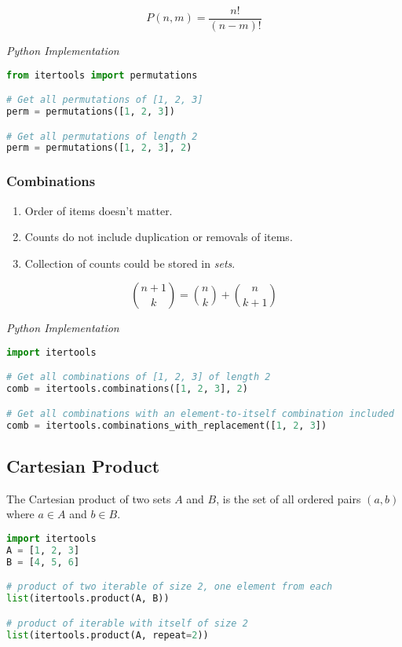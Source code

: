 \documentclass{article}
\begin{document}
    \[
    P(n,m) = \frac{n!}{(n-m)!}
    \]

    
\vspace{8pt} \emph{Python Implementation}
\begin{lstlisting}[language=Python]
from itertools import permutations 

# Get all permutations of [1, 2, 3] 
perm = permutations([1, 2, 3])   

# Get all permutations of length 2 
perm = permutations([1, 2, 3], 2) 
\end{lstlisting} 

    \subsubsection{Combinations}
    \begin{enumerate}
        \item Order of items doesn't matter. 
        \item Counts do not include duplication or removals of items.
        \item Collection of counts could be stored in \emph{sets}.
    \end{enumerate}
    
    
    \[
        \binom{n+1}{k} = \binom{n}{k} + \binom{n}{k+1}
    \]

\vspace{8pt} \emph{Python Implementation}
\begin{lstlisting}[language=Python]
import itertools

# Get all combinations of [1, 2, 3] of length 2 
comb = itertools.combinations([1, 2, 3], 2)

# Get all combinations with an element-to-itself combination included 
comb = itertools.combinations_with_replacement([1, 2, 3])
\end{lstlisting}

    \subsection{Cartesian Product}
    The Cartesian product of two sets $A$ and $B$, is the set of all ordered pairs $(a, b)$ where $a \in A$ and $b \in B$.

\begin{lstlisting}[language=Python]
import itertools
A = [1, 2, 3]
B = [4, 5, 6]

# product of two iterable of size 2, one element from each
list(itertools.product(A, B))

# product of iterable with itself of size 2
list(itertools.product(A, repeat=2))
\end{lstlisting}
\end{document}
